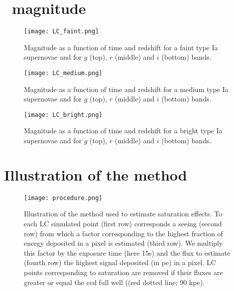 \begin{appendices}
    
\section{\sne~magnitude}

\begin{figure}[htbp]
\begin{center}
  \texttt{[image: LC\_faint.png]}
 \caption{Magnitude as a function of time and redshift for a faint type Ia supernovae and for $g$ (top), $r$ (middle) and $i$ (bottom) bands.}\label{fig:lcfaint}
\end{center}
\end{figure}

\begin{figure}[htbp]
\begin{center}
  \texttt{[image: LC\_medium.png]}
 \caption{Magnitude as a function of time and redshift for a medium type Ia supernovae and for $g$ (top), $r$ (middle) and $i$ (bottom) bands.}\label{fig:lcmedium}
\end{center}
\end{figure}

\begin{figure}[htbp]
\begin{center}
  \texttt{[image: LC\_bright.png]}
 \caption{Magnitude as a function of time and redshift for a bright type Ia supernovae and for $g$ (top), $r$ (middle) and $i$ (bottom) bands.}\label{fig:lcbright}
\end{center}
\end{figure}

\section{Illustration of the method}
\begin{figure}[htbp]
\begin{center}
  \texttt{[image: procedure.png]}
 \caption{Illustration of the method used to estimate saturation effects. To each LC simulated point (first row) corresponds a seeing (second row) from which a factor corresponding to the highest fraction of energy deposited in a pixel is estimated (third row). We multiply this factor by the exposure time (here 15s) and the flux to estimate (fourth row) the highest signal deposited (in pe) in a pixel.  LC points corresponding to saturation are removed if their fluxes are greater or equal the ccd full well ((red dotted line; 90 kpe).}\label{fig:method}
\end{center}
\end{figure}


\end{appendices}

